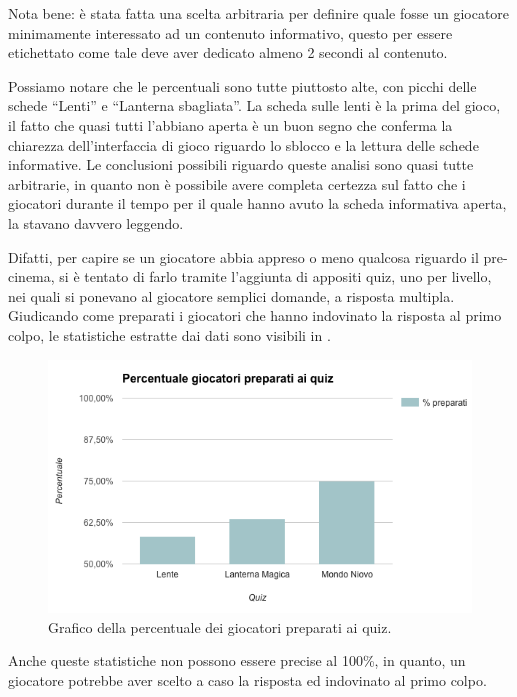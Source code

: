 Nota bene: è stata fatta una scelta arbitraria per definire quale fosse un giocatore minimamente interessato ad un contenuto informativo, questo per essere etichettato come tale deve aver dedicato almeno 2 secondi al contenuto.

Possiamo notare che le percentuali sono tutte piuttosto alte, con picchi delle schede ``Lenti'' e ``Lanterna sbagliata''. La scheda sulle lenti è la prima del gioco, il fatto che quasi tutti l'abbiano aperta è un buon segno che conferma la chiarezza dell'interfaccia di gioco riguardo lo sblocco e la lettura delle schede informative. Le conclusioni possibili riguardo queste analisi sono quasi tutte arbitrarie, in quanto non è possibile avere completa certezza sul fatto che i giocatori durante il tempo per il quale hanno avuto la scheda informativa aperta, la stavano davvero leggendo.

Difatti, per capire se un giocatore abbia appreso o meno qualcosa riguardo il pre-cinema, si è tentato di farlo tramite l'aggiunta di appositi quiz, uno per livello, nei quali si ponevano al giocatore semplici domande, a risposta multipla. Giudicando come preparati i giocatori che hanno indovinato la risposta al primo colpo, le statistiche estratte dai dati sono visibili in \myfig{\ref{fig:test-quiz}}.

\begin{figure}[h]
\centerline{\includegraphics[scale=0.65]{images/risultati/test-quiz.png}}
\caption{Grafico della percentuale dei giocatori preparati ai quiz.}
\label{fig:test-quiz}
\end{figure}

Anche queste statistiche non possono essere precise al 100\%, in quanto, un giocatore potrebbe aver scelto a caso la risposta ed indovinato al primo colpo.

